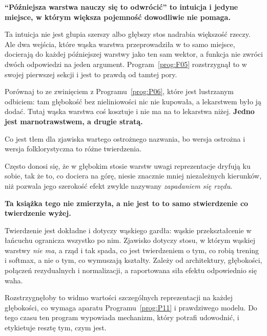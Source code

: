 \begin{fr}
\begin{trapbox}
\textbf{\enquote{Późniejsza warstwa nauczy się to odwrócić} to intuicja i
jedyne miejsce, w którym większa pojemność dowodliwie nie pomaga.}

Ta intuicja nie jest głupia \dash{} szerszy albo głębszy stos nadrabia
większość rzeczy. Ale dwa wejścia, które wąska warstwa przeprowadziła w to samo
miejsce, docierają do każdej późniejszej warstwy jako ten sam wektor, a funkcja
nie zwróci dwóch odpowiedzi na jeden argument. Program~\ref{prog:F05}
rozstrzygnął to w swojej pierwszej sekcji i jest to prawdą od tamtej pory.

Porównaj to ze zwinięciem z Programu~\ref{prog:P06}, które jest lustrzanym
odbiciem: tam głębokość bez nieliniowości nic nie kupowała, a lekarstwem było
ją dodać. Tutaj wąska warstwa coś kosztuje i nie ma na to lekarstwa niżej.
\textbf{Jedno jest marnotrawstwem, a drugie stratą.}
\end{trapbox}
\end{fr}

\begin{fr}
Co jest tłem dla zjawiska wartego ostrożnego nazwania, bo wersja ostrożna i
wersja folklorystyczna to różne twierdzenia.

Często donosi się, że w głębokim stosie warstw uwagi reprezentacje dryfują ku
sobie, tak że to, co dociera na górę, niesie znacznie mniej niezależnych
kierunków, niż pozwala jego szerokość \dash{} efekt zwykle nazywany
\emph{zapadaniem się rzędu}.

\begin{warning}
\textbf{Ta książka tego nie zmierzyła, a nie jest to to samo stwierdzenie co
twierdzenie wyżej.}

Twierdzenie jest dokładne i dotyczy wąskiego gardła: wąskie przekształcenie w
łańcuchu ogranicza wszystko po nim. Zjawisko dotyczy stosu, w którym wąskiej
warstwy \emph{nie ma}, a rząd i tak spada, co jest twierdzeniem o tym, co robią
trening i softmax, a nie o tym, co wymuszają kształty. Zależy od architektury,
głębokości, połączeń rezydualnych i normalizacji, a raportowana siła efektu
odpowiednio się waha.

Rozstrzygnęłoby to widmo wartości szczególnych reprezentacji na każdej
głębokości, co wymaga aparatu Programu~\ref{prog:P11} i prawdziwego modelu. Do
tego czasu ten program wypowiada mechanizm, który potrafi udowodnić, i etykietuje
resztę tym, czym jest.
\end{warning}
\end{fr}


